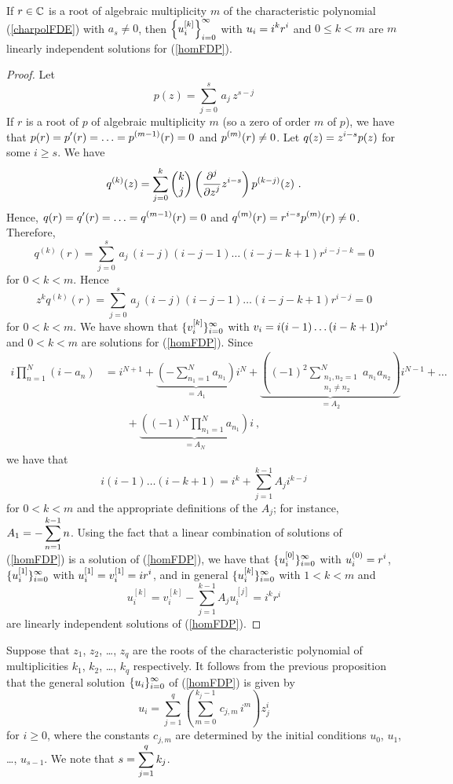 \begin{prop}
If $r \in \CC$ is a root of algebraic multiplicity $m$ of the
characteristic polynomial (\ref{charpolFDE}) with $a_s \neq 0$, then
$\DS \left\{ u_i^{[k]} \right\}_{i=0}^\infty$
with $\DS u_i = i^kr^i$ and $0\leq k <m$
are $m$ linearly independent solutions for (\ref{homFDP}).
\label{rootHO}
\end{prop}

\begin{proof}
Let
\[
p(z) = \sum_{j=0}^s \,a_j \, z^{s-j}
\]
If $r$ is a root of $p$ of algebraic multiplicity $m$ (so a zero of
order $m$ of $p$), we have that
$\DS p(r) = p'(r) = \ldots = p^{(m-1)}(r) = 0$ and
$\DS p^{(m)}(r) \neq 0$.
Let $\DS q(z) = z^{i-s}p(z)$ for some $i \geq s$.  We have
\[
  q^{(k)}(z) = \sum_{j=0}^k \binom{k}{j}\left(\pdfdxn{z^{i-s}}{z}{j}\right)
  p^{(k-j)}(z) \ .
\]
Hence, $\DS q(r) = q'(r) = \ldots = q^{(m-1)}(r) = 0$
and $\DS q^{(m)}(r) = r^{i-s} p^{(m)}(r) \neq 0$.  Therefore,
\[
  q^{(k)}(r) = \sum_{j=0}^s \,a_j \, (i-j)(i-j-1)\ldots(i-j-k+1)r^{i-j-k}
  = 0
\]
for $0<k<m$.  Hence
\[
 z^k q^{(k)}(r) = \sum_{j=0}^s \,a_j \, (i-j)(i-j-1)\ldots(i-j-k+1)r^{i-j}
  = 0
\]
for $0<k<m$.  We have shown that
$\DS \{ v_i^{[k]} \}_{i=0}^\infty$ with
$\DS v_i = i(i-1)\ldots(i-k+1)r^i$ and
$0 < k <m$ are solutions for (\ref{homFDP}).  Since
\begin{align*}
i \prod_{n=1}^N (i - a_n)
&= i^{N+1} + \underbrace{\left(-\sum_{n_1=1}^N a_{n_1}\right)}_{=A_1}  i^N
+ \underbrace{\left( (-1)^2 \sum_{\substack{n_1,n_2=1 \\ n_1 \neq n_2}}^N
a_{n_1}a_{n_2}\right)}_{=A_2} i^{N-1}  + \ldots \\
&\qquad + \underbrace{\left( (-1)^N\prod_{n_1=1}^N a_{n_1}\right)}_{=A_N} i \ ,
\end{align*}
we have that
\[
i(i-1)\ldots(i-k+1) = i^k + \sum_{j=1}^{k-1}A_j i^{k-j}
\]
for $0<k<m$ and the appropriate definitions of the $A_j$; for
instance, $\DS A_1 = - \sum_{n=1}^{k-1} n$.
Using the fact that a linear combination of solutions of
(\ref{homFDP}) is a solution of (\ref{homFDP}), we have that
$\DS \{ u_i^{[0]} \}_{i=0}^\infty$ with $\DS u_i^{(0)} = r^i$,
$\DS \{ u_i^{[1]} \}_{i=0}^\infty$ with
$\DS u_i^{[1]} = v_i^{[1]} = i r^i$,
and in general
$\DS \{ u_i^{[k]} \}_{i=0}^\infty$ with $1<k<m$ and
\[
u_i^{[k]} = v_i^{[k]} - \sum_{j=1}^{k-1} A_j u_i^{[j]} = i^k r^i
\]
are linearly independent solutions of (\ref{homFDP}).
\end{proof}

Suppose that $z_1$, $z_2$, \ldots, $z_q$ are the
roots of the characteristic polynomial of multiplicities $k_1$, $k_2$,
\ldots, $k_q$ respectively.  It follows from the previous proposition
that the general solution
$\DS \{ u_i \}_{i=0}^\infty$ of (\ref{homFDP}) is given by
\[
u_i = \sum_{j=1}^q \left( \sum_{m=0}^{k_j-1}\,c_{j,m}\,i^m \right) z_j^i 
\]
for $i \geq 0$, where the constants $c_{j,m}$ are determined by the
initial conditions $u_0$, $u_1$, \ldots, $u_{s-1}$.  We note that
$\DS s = \sum_{j=1}^q k_j$.

